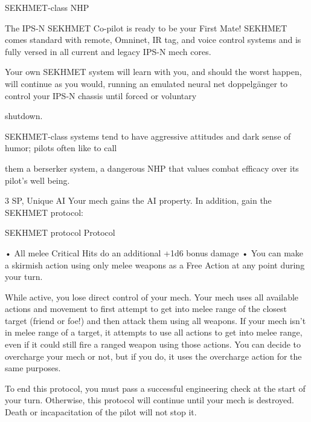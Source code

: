 SEKHMET-class NHP  

The IPS-N SEKHMET Co-pilot is ready to be your First Mate! SEKHMET comes standard with remote,  
Omninet, IR tag, and voice control systems and is fully versed in all current and legacy IPS-N mech cores.  

Your own SEKHMET system will learn with you, and should the worst happen, will continue as you would,  
running an emulated neural net doppelgänger to control your IPS-N chassis until forced or voluntary  

shutdown.   

SEKHMET-class systems tend to have aggressive attitudes and dark sense of humor; pilots often like to call  

them a berserker system, a dangerous NHP that values combat efficacy over its pilot’s well being.  

3 SP, Unique  
AI  
Your mech gains the AI property. In addition, gain the SEKHMET protocol:
 

SEKHMET protocol  
Protocol
 
        • All melee Critical Hits do an additional +1d6 bonus damage  
        •  You can make a skirmish action using only melee weapons as a Free Action at any point  
          during your turn.
 

                                                                                                                  


While active, you lose direct control of your mech. Your mech uses all available actions and  
movement to first attempt to get into melee range of the closest target (friend or foe!) and then  
attack them using all weapons. If your mech isn’t in melee range of a target, it attempts to use all  
actions to get into melee range, even if it could still fire a ranged weapon using those actions.  
You can decide to overcharge your mech or not, but if you do, it uses the overcharge action for  
the same purposes.
 

To end this protocol, you must pass a successful engineering check at the start of your turn.  
Otherwise, this protocol will continue until your mech is destroyed. Death or incapacitation of the  
pilot will not stop it.
 